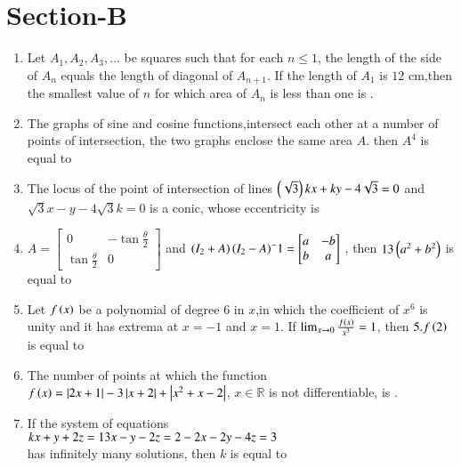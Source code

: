 \documentclass[journal,12pt,onecolumn]{IEEEtran}
\theoremstyle{remark}
\begin{document}
\section{Section-B}
\begin{enumerate}
	\item Let $A_1,A_2,A_3,\dots$ be squares such that for each $n\leq1$, the length of the side of $A_n$ equals the length of diagonal of $A_{n+1}$. If the length of $A_1$ is $12$ cm,then the smallest value of $n$ for which area of $A_n$ is less than one is .\\

	\item The graphs of sine and cosine functions,intersect each other at a number of points of intersection, the two graphs enclose the same area $A$. then $A^4$ is equal to \\

	\item The locus of the point of intersection of lines $\left(\sqrt{3}\right)kx+ky-4\sqrt{3}= 0$ and $\sqrt{3}x-y-4\sqrt{3}k=0$ is a conic, whose eccentricity is \\

	\item $A=\begin{bmatrix}
			0 & -\tan{\frac{\theta}{2}}\\
			\tan{\frac{\theta}{2}} & 0
	\end{bmatrix}$ and $\left(I_2+A\right){\left(I_2-A\right)}^-1= \begin{bmatrix}
		a & -b\\
		b & a
	\end{bmatrix}$
		, then $13\left(a^2+b^2\right)$ is equal to \\
		
	\item Let $f\left(x\right)$ be a polynomial of degree $6$ in $x$,in which the coefficient of $x^6$ is unity and it has extrema at $x=-1$ and $x=1$. If $\lim_{x\to 0} \frac{f\left(x\right)}{x^3}=1$, then $5.f\left(2\right)$ is equal to \\

	\item The number of points at which the function $f\left(x\right)=\left\vert2x+1\right\vert-3\left\vert x+2\right\vert+\left\vert x^2+x-2\right\vert$, $x\in\mathbb{R}$ is not differentiable, is .
		
	\item If the system of equations \\
		$kx+y+2z=1\\
		3x-y-2z=2\\
		-2x-2y-4z=3$\\
		has infinitely many solutions, then $k$ is equal to \\


\end{enumerate}
\end{document}
